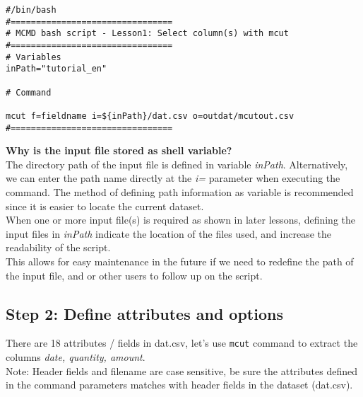 \begin{verbatim}
#/bin/bash
#================================
# MCMD bash script - Lesson1: Select column(s) with mcut
#================================
# Variables
inPath="tutorial_en"

# Command 

mcut f=fieldname i=${inPath}/dat.csv o=outdat/mcutout.csv
#================================

\end{verbatim}

{\setlength{\parindent}{0cm}


\textbf{Why is the input file stored as shell variable?} \\

    
The directory path of the input file is defined in variable \emph{inPath}. Alternatively, we can enter the path name directly at the \emph{i=} parameter when executing the command. The method of defining path information as variable is recommended since it is easier to locate the current dataset. \\

When one or more input file(s) is required as shown in later lessons, defining the input files in \emph{inPath} indicate the location of the files used, and increase the readability of the script.\\

This allows for easy maintenance in the future if we need to redefine the path of the input file, and or other users to follow up on the script.

}

\subsection{Step 2: Define attributes and options }

There are 18 attributes / fields in dat.csv, let's use \verb|mcut| command to extract the columns \emph{date, quantity, amount}. \\
Note: Header fields and filename are case sensitive, be sure the attributes defined in the command parameters matches with header fields in the dataset (dat.csv). \\

